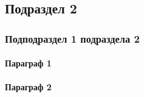\subsection{Подраздел 2}

\subsubsection{Подподраздел 1 подраздела 2}

\paragraph{Параграф 1}

\paragraph{Параграф 2}